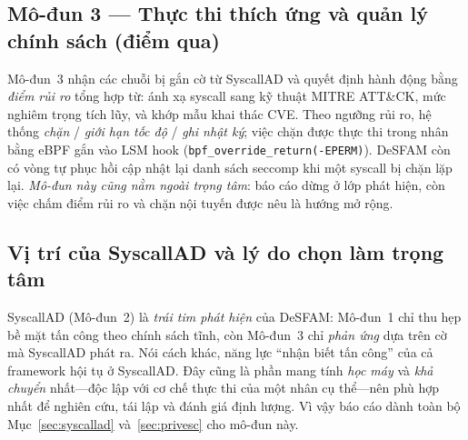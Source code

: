 \subsection{Mô-đun 3 --- Thực thi thích ứng và quản lý chính sách (điểm qua)}
\label{subsec:m3}
Mô-đun~3 nhận các chuỗi bị gắn cờ từ SyscallAD và quyết định hành động bằng
\emph{điểm rủi ro} tổng hợp từ: ánh xạ syscall sang kỹ thuật MITRE ATT\&CK, mức
nghiêm trọng tích lũy, và khớp mẫu khai thác CVE. Theo ngưỡng rủi ro, hệ thống
\emph{chặn} / \emph{giới hạn tốc độ} / \emph{ghi nhật ký}; việc chặn được thực thi
trong nhân bằng eBPF gắn vào LSM hook (\texttt{bpf\_override\_return(-EPERM)}). DeSFAM
còn có vòng tự phục hồi cập nhật lại danh sách seccomp khi một syscall bị chặn lặp
lại. \emph{Mô-đun này cũng nằm ngoài trọng tâm}: báo cáo dừng ở lớp phát hiện, còn
việc chấm điểm rủi ro và chặn nội tuyến được nêu là hướng mở rộng.

\subsection{Vị trí của SyscallAD và lý do chọn làm trọng tâm}
SyscallAD (Mô-đun~2) là \emph{trái tim phát hiện} của DeSFAM: Mô-đun~1 chỉ thu hẹp
bề mặt tấn công theo chính sách tĩnh, còn Mô-đun~3 chỉ \emph{phản ứng} dựa trên cờ
mà SyscallAD phát ra. Nói cách khác, năng lực ``nhận biết tấn công'' của cả
framework hội tụ ở SyscallAD. Đây cũng là phần mang tính \emph{học máy} và \emph{khả
chuyển} nhất---độc lập với cơ chế thực thi của một nhân cụ thể---nên phù hợp nhất để
nghiên cứu, tái lập và đánh giá định lượng. Vì vậy báo cáo dành toàn bộ
Mục~\ref{sec:syscallad} và~\ref{sec:privesc} cho mô-đun này.
